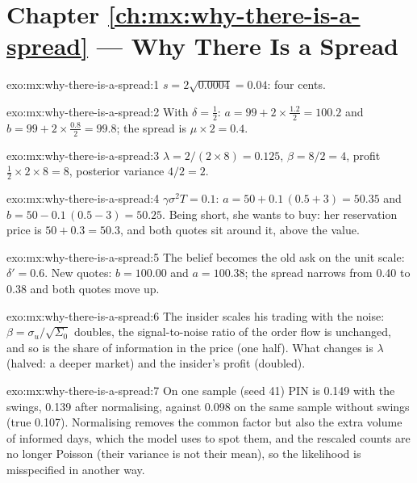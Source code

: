 \section*{Chapter \ref{ch:mx:why-there-is-a-spread} --- Why There Is a Spread}

\begin{solution}{exo:mx:why-there-is-a-spread:1}
$s=2\sqrt{0.0004}=0.04$: four cents.
\end{solution}

\begin{solution}{exo:mx:why-there-is-a-spread:2}
With $\delta=\tfrac12$: $a=99+2\times\tfrac{1.2}{2}=100.2$ and $b=99+2\times\tfrac{0.8}{2}=99.8$; the spread is $\mu\times2=0.4$.
\end{solution}

\begin{solution}{exo:mx:why-there-is-a-spread:3}
$\lambda=2/(2\times8)=0.125$, $\beta=8/2=4$, profit $\tfrac12\times2\times8=8$, posterior variance $4/2=2$.
\end{solution}

\begin{solution}{exo:mx:why-there-is-a-spread:4}
$\gamma\sigma^2T=0.1$: $a=50+0.1\,(0.5+3)=50.35$ and $b=50-0.1\,(0.5-3)=50.25$. Being short, she wants to buy: her reservation price is
$50+0.3=50.3$, and both quotes sit around it, above the value.
\end{solution}

\begin{solution}{exo:mx:why-there-is-a-spread:5}
The belief becomes the old ask on the unit scale: $\delta'=0.6$. New quotes: $b=100.00$ and $a=100.38$; the spread narrows from 0.40 to 0.38 and both quotes
move up.
\end{solution}

\begin{solution}{exo:mx:why-there-is-a-spread:6}
The insider scales his trading with the noise: $\beta=\sigma_u/\sqrt{\Sigma_0}$ doubles, the signal-to-noise ratio of the order flow is unchanged, and so is
the share of information in the price (one half). What changes is $\lambda$ (halved: a deeper market) and the insider's profit (doubled).
\end{solution}

\begin{solution}{exo:mx:why-there-is-a-spread:7}
On one sample (seed 41) PIN is 0.149 with the swings, 0.139 after normalising, against 0.098 on the same sample without swings (true 0.107). Normalising removes
the common factor but also the extra volume of informed days, which the model uses to spot them, and the rescaled counts are no longer Poisson (their
variance is not their mean), so the likelihood is misspecified in another way.
\end{solution}

